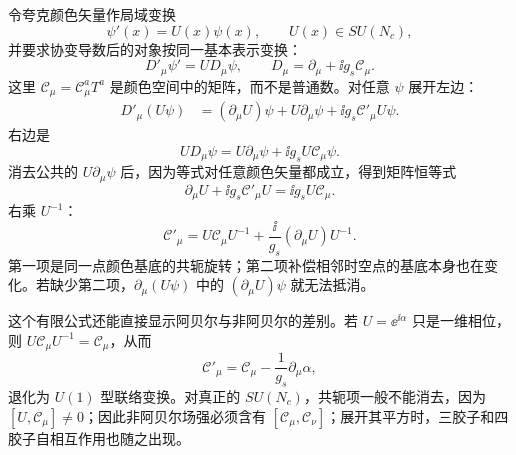 \begin{derivation}
令夸克颜色矢量作局域变换
\[
\psi'(x)=U(x)\psi(x),
\qquad U(x)\in SU(N_c),
\]
并要求协变导数后的对象按同一基本表示变换：
\[
D'_\mu\psi'=U D_\mu\psi,
\qquad
D_\mu=\partial_\mu+\ii g_s\mathscr C_\mu.
\]
这里 $\mathscr C_\mu=\mathscr C_\mu^aT^a$ 是颜色空间中的矩阵，而不是普通数。对任意 $\psi$ 展开左边：
\begin{align*}
D'_\mu(U\psi)
&=(\partial_\mu U)\psi
+U\partial_\mu\psi
+\ii g_s\mathscr C'_\mu U\psi.
\end{align*}
右边是
\[
UD_\mu\psi
=U\partial_\mu\psi+\ii g_sU\mathscr C_\mu\psi.
\]
消去公共的 $U\partial_\mu\psi$ 后，因为等式对任意颜色矢量都成立，得到矩阵恒等式
\[
\partial_\mu U+\ii g_s\mathscr C'_\mu U
=\ii g_sU\mathscr C_\mu.
\]
右乘 $U^{-1}$：
\[
\boxed{
\mathscr C'_\mu
=U\mathscr C_\mu U^{-1}
+\frac{\ii}{g_s}(\partial_\mu U)U^{-1}.}
\]
第一项是同一点颜色基底的共轭旋转；第二项补偿相邻时空点的基底本身也在变化。若缺少第二项，$\partial_\mu(U\psi)$ 中的 $(\partial_\mu U)\psi$ 就无法抵消。

这个有限公式还能直接显示阿贝尔与非阿贝尔的差别。若 $U=\ee^{\ii\alpha}$ 只是一维相位，则 $U\mathscr C_\mu U^{-1}=\mathscr C_\mu$，从而
\[
\mathscr C'_\mu
=\mathscr C_\mu-\frac1{g_s}\partial_\mu\alpha,
\]
退化为 $U(1)$ 型联络变换。对真正的 $SU(N_c)$，共轭项一般不能消去，因为 $[U,\mathscr C_\mu]\neq0$；因此非阿贝尔场强必须含有 $[\mathscr C_\mu,\mathscr C_\nu]$；展开其平方时，三胶子和四胶子自相互作用也随之出现。
\end{derivation}
